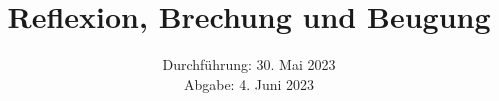 

\subject{\texorpdfstring{\vspace{2ex}}{}V400\texorpdfstring{\vspace{-2ex}}{}} %
\title{Reflexion, Brechung und Beugung} %
\date{
	Durchführung: 30. Mai 2023 %
	\\ Abgabe: 4. Juni 2023 %
}




\maketitle
\thispagestyle{empty}


\tableofcontents
\newpage







\printbibliography{}

\newpage



